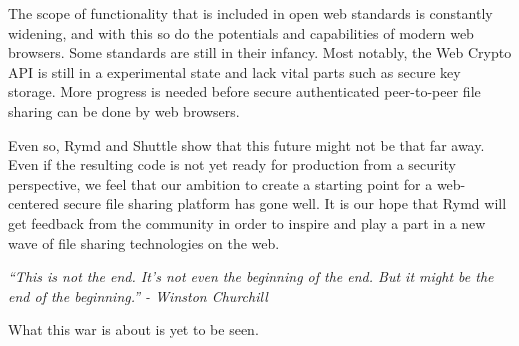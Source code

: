The scope of functionality that is included in open web standards is constantly widening, and with this so do the potentials and capabilities of modern web browsers. Some standards are still in their infancy. Most notably, the Web Crypto API is still in a experimental state and lack vital parts such as secure key storage. More progress is needed before secure authenticated peer-to-peer file sharing can be done by web browsers.

Even so, Rymd and Shuttle show that this future might not be that far away. Even if the resulting code is not yet ready for production from a security perspective, we feel that our ambition to create a starting point for a web-centered secure file sharing platform has gone well. It is our hope that Rymd will get feedback from the community in order to inspire and play a part in a new wave of file sharing technologies on the web.


\emph{``This is not the end. It's not even the beginning of the end. But it might be the end of the beginning.'' - Winston Churchill}

What this war is about is yet to be seen.
